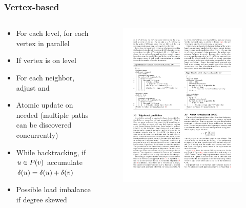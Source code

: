 \begin{frame}
  \frametitle{Vertex-based}

  \begin{columns}[onlytextwidth]
    \begin{column}{0.5\textwidth}
      \begin{itemize}
        \item For each level, for each vertex in parallel
        \item If vertex is on level
        \item For each neighbor, \\ adjust \pred and \paths
        \item Atomic update on \paths needed (multiple paths can be discovered concurrently)
        \item While backtracking, if $u \in P(v)$ accumulate $\delta(u) = \delta(u) + \delta(v)$
        \item Possible load imbalance if degree skewed
      \end{itemize}
    \end{column}

    \begin{column}{0.5\textwidth}
      \begin{figure}[t]
        \centering
        \includegraphics[width=\textwidth, height=0.8\textheight, keepaspectratio]{imgs/gpu-algo-vertex}
      \end{figure}
    \end{column}
  \end{columns}

\end{frame}



